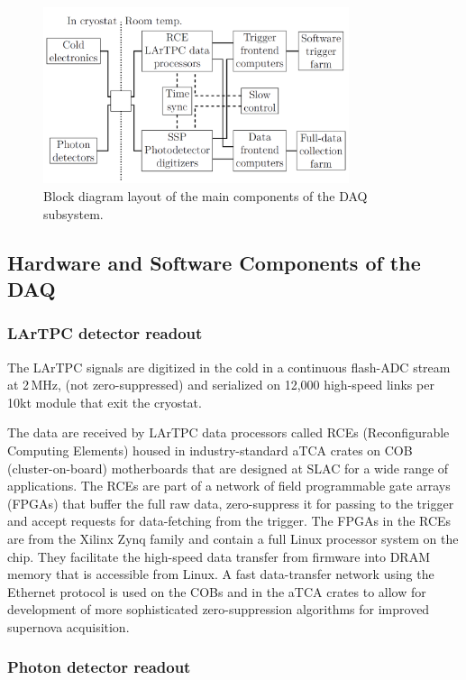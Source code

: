 \begin{figure}[h!]
	\centering
	\includegraphics[width=0.8\textwidth]{daq-block-diagram.png}
	\caption{Block diagram layout of the main components of the DAQ subsystem.}
	\label{fig:fddaqblock}
\end{figure}


\subsection{Hardware and Software Components of the DAQ}
\subsubsection{LArTPC detector readout}

The LArTPC signals are digitized in the cold in a continuous flash-ADC stream at 2\,MHz, (not zero-suppressed)
and serialized on 12,000 high-speed links per 10kt module that exit the cryostat.

The data are received by LArTPC data processors called RCEs (Reconfigurable
Computing Elements) housed in industry-standard aTCA crates on COB (cluster-on-board)
motherboards that are designed at SLAC for a wide range of applications.  The RCEs are part of a
network of field programmable gate arrays (FPGAs) that buffer the full raw data,
zero-suppress it for passing to the trigger and accept requests for
data-fetching from the trigger.  The FPGAs in the RCEs are from the
Xilinx Zynq family and contain a full Linux processor system on the
chip.  They facilitate the high-speed data transfer from firmware into
DRAM memory that is accessible from Linux.  A fast data-transfer
network using the Ethernet protocol is used on the COBs and in the
aTCA crates to allow for development of more sophisticated zero-suppression algorithms
for improved supernova acquisition.

\subsubsection{Photon detector readout}

